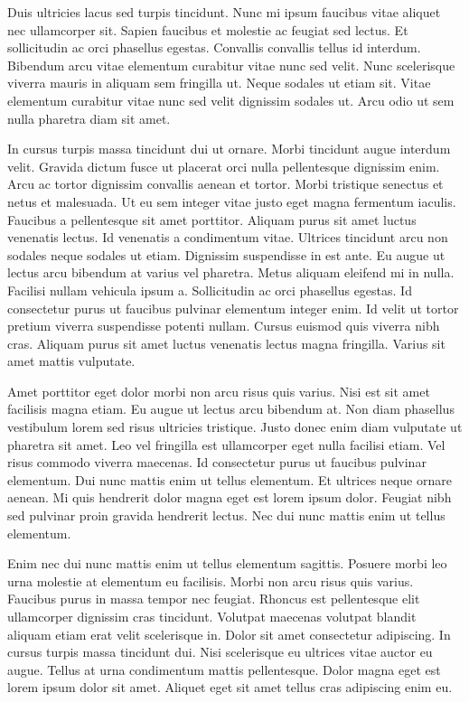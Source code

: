 \documentclass[11pt,a4paper]{article}
\begin{document}
Duis ultricies lacus sed turpis tincidunt. Nunc mi ipsum faucibus vitae aliquet nec ullamcorper sit. Sapien faucibus et molestie ac feugiat sed lectus. Et sollicitudin ac orci phasellus egestas. Convallis convallis tellus id interdum. Bibendum arcu vitae elementum curabitur vitae nunc sed velit. Nunc scelerisque viverra mauris in aliquam sem fringilla ut. Neque sodales ut etiam sit. Vitae elementum curabitur vitae nunc sed velit dignissim sodales ut. Arcu odio ut sem nulla pharetra diam sit amet.

In cursus turpis massa tincidunt dui ut ornare. Morbi tincidunt augue interdum velit. Gravida dictum fusce ut placerat orci nulla pellentesque dignissim enim. Arcu ac tortor dignissim convallis aenean et tortor. Morbi tristique senectus et netus et malesuada. Ut eu sem integer vitae justo eget magna fermentum iaculis. Faucibus a pellentesque sit amet porttitor. Aliquam purus sit amet luctus venenatis lectus. Id venenatis a condimentum vitae. Ultrices tincidunt arcu non sodales neque sodales ut etiam. Dignissim suspendisse in est ante. Eu augue ut lectus arcu bibendum at varius vel pharetra. Metus aliquam eleifend mi in nulla. Facilisi nullam vehicula ipsum a. Sollicitudin ac orci phasellus egestas. Id consectetur purus ut faucibus pulvinar elementum integer enim. Id velit ut tortor pretium viverra suspendisse potenti nullam. Cursus euismod quis viverra nibh cras. Aliquam purus sit amet luctus venenatis lectus magna fringilla. Varius sit amet mattis vulputate.

Amet porttitor eget dolor morbi non arcu risus quis varius. Nisi est sit amet facilisis magna etiam. Eu augue ut lectus arcu bibendum at. Non diam phasellus vestibulum lorem sed risus ultricies tristique. Justo donec enim diam vulputate ut pharetra sit amet. Leo vel fringilla est ullamcorper eget nulla facilisi etiam. Vel risus commodo viverra maecenas. Id consectetur purus ut faucibus pulvinar elementum. Dui nunc mattis enim ut tellus elementum. Et ultrices neque ornare aenean. Mi quis hendrerit dolor magna eget est lorem ipsum dolor. Feugiat nibh sed pulvinar proin gravida hendrerit lectus. Nec dui nunc mattis enim ut tellus elementum.

Enim nec dui nunc mattis enim ut tellus elementum sagittis. Posuere morbi leo urna molestie at elementum eu facilisis. Morbi non arcu risus quis varius. Faucibus purus in massa tempor nec feugiat. Rhoncus est pellentesque elit ullamcorper dignissim cras tincidunt. Volutpat maecenas volutpat blandit aliquam etiam erat velit scelerisque in. Dolor sit amet consectetur adipiscing. In cursus turpis massa tincidunt dui. Nisi scelerisque eu ultrices vitae auctor eu augue. Tellus at urna condimentum mattis pellentesque. Dolor magna eget est lorem ipsum dolor sit amet. Aliquet eget sit amet tellus cras adipiscing enim eu.
\end{document}
